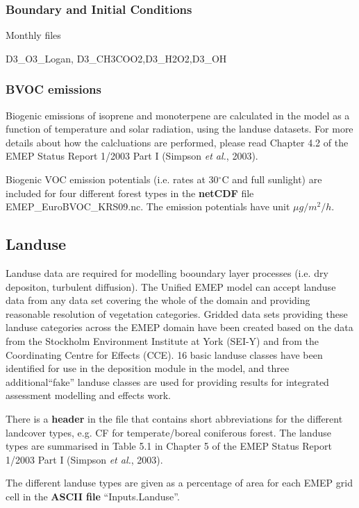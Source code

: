 \subsubsection{Boundary and Initial Conditions}

Monthly files

D3\_O3\_Logan, D3\_CH3COO2,D3\_H2O2,D3\_OH

\subsubsection{BVOC emissions}

Biogenic emissions of isoprene and monoterpene are calculated in the model as a function of temperature 
and solar radiation, using the landuse datasets.  For more details about how the
calcluations are performed, please read Chapter 4.2 of the EMEP
Status Report 1/2003 Part I (Simpson {\sl et al.}, 2003).

Biogenic VOC emission potentials (i.e. rates at 30$^\circ$C and full sunlight)
are included for four different forest types in the {\bf netCDF } file \\
EMEP\_EuroBVOC\_KRS09.nc. 
The emission potentials have unit $\mu g/m^{2} /h$.


\subsection{Landuse}

Landuse data are required for modelling booundary layer processes
(i.e. dry depositon, turbulent diffusion).
The Unified EMEP model can accept landuse data from any
data set covering the whole of the domain and providing reasonable 
resolution of vegetation categories. Gridded data sets providing
these landuse categories across the EMEP domain have been created
based on the data from the Stockholm Environment Institute at York 
(SEI-Y) and from the Coordinating Centre for Effects (CCE). 
16 basic landuse classes have been identified for use in the
deposition module in the model, and three additional``fake'' landuse
classes are used for providing results for integrated assessment
modelling and effects work.

There is a {\bf header} in the file that contains short abbreviations 
for the different landcover
types, e.g. CF for temperate/boreal coniferous forest. The landuse
types are summarised in Table 5.1 in Chapter 5 of the EMEP Status
Report 1/2003 Part I (Simpson {\sl et al.}, 2003).

The different landuse types are given as a percentage of area for each 
EMEP grid cell in the {\bf ASCII file} ``Inputs.Landuse''. 



